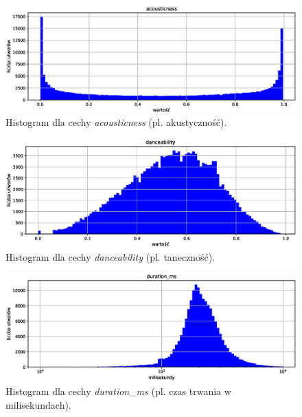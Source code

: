 \documentclass[a4paper,11pt]{article}
\begin{document}
    \smallskip

    \begin{figure}[H]
        \label{fig:acousticness}
        \centering
        \includegraphics[width=\textwidth]{acousticness}
        \caption{Histogram dla cechy \textit{acousticness} (pl. akustyczność).}
    \end{figure}

    \smallskip

    \begin{figure}[H]
        \label{fig:danceability}
        \centering
        \includegraphics[width=\textwidth]{danceability}
        \caption{Histogram dla cechy \textit{danceability} (pl. taneczność).}
    \end{figure}

    \smallskip

    \begin{figure}[H]
        \label{fig:duration_ms}
        \centering
        \includegraphics[width=\textwidth]{duration_ms}
        \caption{Histogram dla cechy \textit{duration\_ms} (pl. czas trwania w milisekundach).}
    \end{figure}
\end{document}

